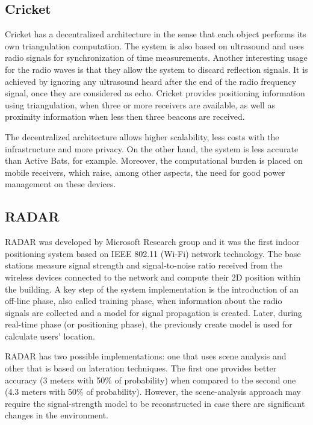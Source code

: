 \subsection{Cricket}
Cricket has a decentralized architecture in the sense that each object performs its own triangulation computation. The system is also based on ultrasound and uses radio signals for synchronization of time measurements. Another interesting usage for the radio waves is that they allow the system to discard reflection signals. It is achieved by ignoring any ultrasound heard after the end of the radio frequency signal, once they are considered as echo. Cricket provides positioning information using triangulation, when three or more receivers are available, as well as proximity information when less then three beacons are received.

The decentralized architecture allows higher scalability, less costs with the infrastructure and more privacy. On the other hand, the system is less accurate than Active Bats, for example. Moreover, the computational burden is placed on mobile receivers, which raise, among other aspects, the need for good power management on these devices.

\subsection{RADAR}
RADAR was developed by Microsoft Research group and it was the first indoor positioning system based on IEEE 802.11 (Wi-Fi) network technology. The base stations measure signal strength and signal-to-noise ratio received from the wireless devices connected to the network and compute their 2D position within the building. A key step of the system implementation is the introduction of an off-line phase, also called training phase, when information about the radio signals are collected and a model for signal propagation is created. Later, during real-time phase (or positioning phase), the previously create model is used for calculate users' location.

RADAR has two possible implementations: one that uses scene analysis and other that is based on lateration techniques. The first one provides better accuracy (3 meters with 50\% of probability) when compared to the second one (4.3 meters with 50\% of probability). However, the scene-analysis approach may require the signal-strength model to be reconstructed in case there are significant changes in the environment.

